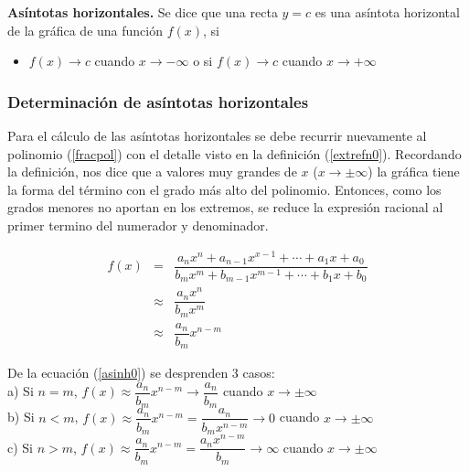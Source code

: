 \begin{mydef}
\textbf{Asíntotas horizontales. } Se dice que una recta $y=c$ es una asíntota horizontal de la gráfica de una función $f(x)$, si
\begin{itemize}
	\item $f(x)\rightarrow c$ cuando $x\rightarrow -\infty $ o si $f(x)\rightarrow c$ cuando $x\rightarrow +\infty $
\end{itemize}
\end{mydef}


\subsubsection{Determinación de asíntotas horizontales}
 Para el cálculo de las asíntotas horizontales se debe recurrir nuevamente al polinomio (\ref{fracpol}) con el detalle visto en la definición (\ref{extrefn0}). Recordando la definición, nos dice que a valores muy grandes de $x$ ($x\rightarrow \pm\infty$) la gráfica tiene la forma del término con el grado más alto del polinomio. Entonces, como los grados menores no aportan en los extremos, se reduce la expresión racional al primer termino del numerador y denominador. 

\begin{eqnarray}
f(x)&=&\dfrac{a_{n}x^{n}+a_{n-1}x^{x-1}+\cdots +a_{1}x+a_{0}}{b_{m}x^{m}+b_{m-1}x^{m-1}+\cdots + b_{1}x+b_{0}}\nonumber\\
&\approx &\dfrac{a_{n}x^{n}}{b_{m}x^{m}}\nonumber\\
&\approx & \dfrac{a_{n}}{b_{m}}x^{n-m}
\label{asinh0}
\end{eqnarray}

De la ecuación (\ref{asinh0}) se desprenden 3 casos:\\

\noindent a) Si $n=m$, $f(x)\approx \dfrac{a_{n}}{b_{m}}x^{n-m}\rightarrow \dfrac{a_{n}}{b_{m}}$ cuando $x\rightarrow \pm\infty$\\

\noindent b) Si $n<m$, $f(x)\approx \dfrac{a_{n}}{b_{m}}x^{n-m}= \dfrac{a_{n}}{b_{m}x^{n-m}}\rightarrow 0$ cuando $x\rightarrow \pm\infty$\\

\noindent c) Si $n>m$, $f(x)\approx \dfrac{a_{n}}{b_{m}}x^{n-m}= \dfrac{a_{n}x^{n-m}}{b_{m}}\rightarrow \infty$ cuando $x\rightarrow \pm\infty$\\

